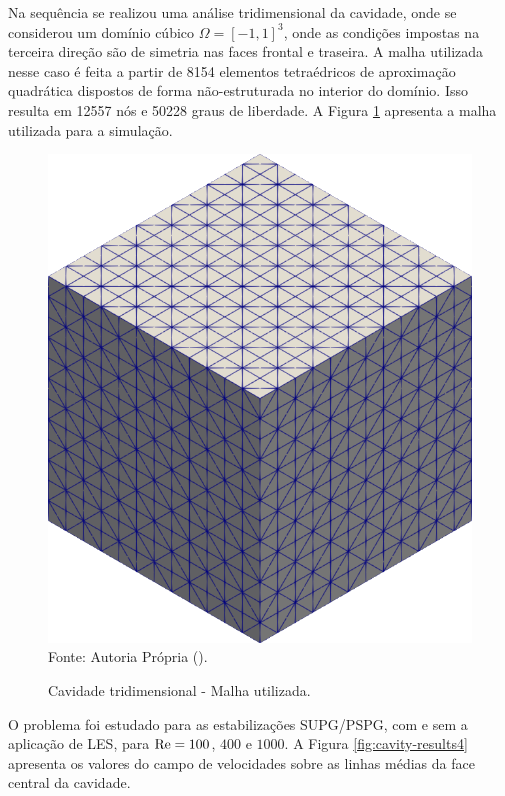 Na sequência se realizou uma análise tridimensional da cavidade, onde se considerou um domínio cúbico $\Omega=[-1,1]^3$, onde as condições impostas na terceira direção são de simetria nas faces frontal e traseira. A malha utilizada nesse caso é feita a partir de 8154 elementos tetraédricos de aproximação quadrática dispostos de forma não-estruturada no interior do domínio. Isso resulta em 12557 nós e 50228 graus de liberdade. A Figura \ref{fig:cavity-mesh3} apresenta a malha utilizada para a simulação.

\begin{figure}[h!]
    \centering
    \caption{Cavidade tridimensional - Malha utilizada.}
    \includegraphics[width=0.4\linewidth]{Figuras/cavity3D/malha.png}
    \\Fonte: Autoria Própria (\the\year).
    \label{fig:cavity-mesh3}
\end{figure}

O problema foi estudado para as estabilizações SUPG/PSPG, com e sem a aplicação de LES, para $\mathrm{Re}=100$, $400$ e $1000$. A Figura \ref{fig:cavity-results4} apresenta os valores do campo de velocidades sobre as linhas médias da face central da cavidade.

